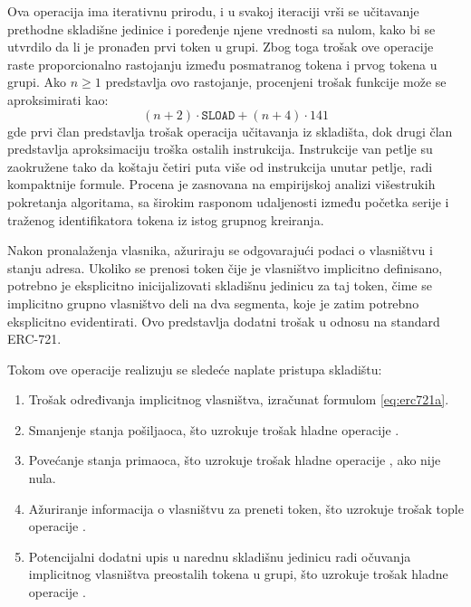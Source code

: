 Ova operacija ima iterativnu prirodu, i u svakoj iteraciji vrši se učitavanje prethodne skladišne jedinice i poređenje njene vrednosti sa nulom, kako bi se utvrdilo da li je pronađen prvi token u grupi. Zbog toga trošak ove operacije raste proporcionalno rastojanju između posmatranog tokena i prvog tokena u grupi. Ako $n \geq 1$ predstavlja ovo rastojanje, procenjeni trošak funkcije može se aproksimirati kao:
\begin{equation}
\label{eq:erc721a}
(n + 2) \cdot \texttt{SLOAD} + (n + 4) \cdot 141
\end{equation}
gde prvi član predstavlja trošak operacija učitavanja iz skladišta, dok drugi član predstavlja aproksimaciju troška ostalih instrukcija. Instrukcije van petlje su zaokružene tako da koštaju četiri puta više od instrukcija unutar petlje, radi kompaktnije formule. Procena je zasnovana na empirijskoj analizi višestrukih pokretanja algoritama, sa širokim rasponom udaljenosti između početka serije i traženog identifikatora tokena iz istog grupnog kreiranja.

Nakon pronalaženja vlasnika, ažuriraju se odgovarajući podaci o vlasništvu i stanju adresa. Ukoliko se prenosi token čije je vlasništvo implicitno definisano, potrebno je eksplicitno inicijalizovati skladišnu jedinicu za taj token, čime se implicitno grupno vlasništvo deli na dva segmenta, koje je zatim potrebno eksplicitno evidentirati. Ovo predstavlja dodatni trošak u odnosu na standard ERC-721.

Tokom ove operacije realizuju se sledeće naplate pristupa skladištu:
\begin{enumerate}
\item Trošak određivanja implicitnog vlasništva, izračunat formulom \ref{eq:erc721a}.
\item Smanjenje stanja pošiljaoca, što uzrokuje trošak hladne operacije \Sd.
\item Povećanje stanja primaoca, što uzrokuje trošak hladne operacije \Sd, ako nije nula.
\item Ažuriranje informacija o vlasništvu za preneti token, što uzrokuje trošak tople operacije \Sd.
\item Potencijalni dodatni upis u narednu skladišnu jedinicu radi očuvanja implicitnog vlasništva preostalih tokena u grupi, što uzrokuje trošak hladne operacije \Sj.
\end{enumerate}

